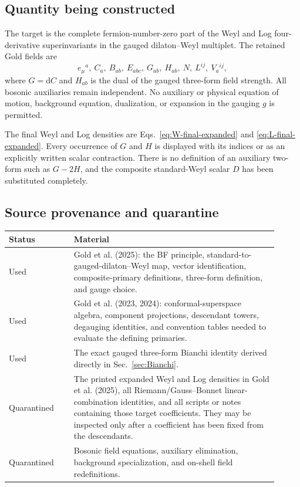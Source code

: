 \documentclass[11pt]{article}
\begin{document}
\subsection{Quantity being constructed}

The target is the complete fermion-number-zero part of the Weyl and Log
four-derivative superinvariants in the gauged dilaton--Weyl multiplet.  The
retained Gold fields are
\[
e_\mu{}^a,\ C_a,\ B_{ab},\ E_{abc},\ G_{ab},\ H_{ab},\
N,\ L^{ij},\ V_a{}^{ij},
\]
where $G=\mathrm dC$ and $H_{ab}$ is the dual of the gauged three-form field
strength.  All bosonic auxiliaries remain independent.  No auxiliary or
physical equation of motion, background equation, dualization, or expansion
in the gauging $g$ is permitted.

The final Weyl and Log densities are Eqs.~\eqref{eq:W-final-expanded} and
\eqref{eq:L-final-expanded}.  Every occurrence of $G$ and $H$ is displayed
with its indices or as an explicitly written scalar contraction.  There is
no definition of an auxiliary two-form such as $G-2H$, and the composite
standard-Weyl scalar $D$ has been substituted completely.

\subsection{Source provenance and quarantine}

\begin{center}
\begin{tabular}{>{\raggedright\arraybackslash}p{0.22\linewidth}>{\raggedright\arraybackslash}p{0.69\linewidth}}
\toprule
Status & Material\\
\midrule
Used & Gold et al. (2025): the BF principle, standard-to-gauged-dilaton--Weyl
map, vector identification, composite-primary definitions, three-form
definition, and gauge choice.\\
Used & Gold et al. (2023, 2024): conformal-superspace algebra, component
projections, descendant towers, degauging identities, and convention tables
needed to evaluate the defining primaries.\\
Used & The exact gauged three-form Bianchi identity derived directly in
Sec.~\ref{sec:Bianchi}.\\
Quarantined & The printed expanded Weyl and Log densities in Gold et al.
(2025), all Riemann/Gauss--Bonnet linear-combination identities, and all
scripts or notes containing those target coefficients.  They may be inspected
only after a coefficient has been fixed from the descendants.\\
Quarantined & Bosonic field equations, auxiliary elimination, background
specialization, and on-shell field redefinitions.\\
\bottomrule
\end{tabular}
\end{center}
\end{document}
